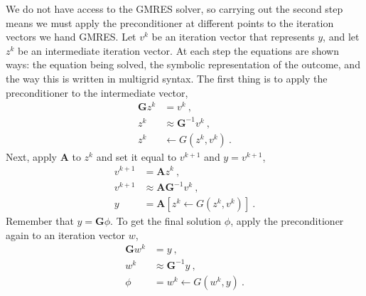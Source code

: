 \documentclass[12pt, letterpaper]{article}
\newcommand{\ve}[1]{\ensuremath{\mathbf{#1}}}
\begin{document}
We do not have access to the GMRES solver, so carrying out the second step means we must apply the preconditioner at different points to the iteration vectors we hand GMRES. Let $v^{k}$ be an iteration vector that represents $y$, and let $z^{k}$ be an intermediate iteration vector. At each step the equations are shown ways: the equation being solved, the symbolic representation of the outcome, and the way this is written in multigrid syntax. The first thing is to apply the preconditioner to the intermediate vector,
%
\begin{align}
  \ve{G}z^{k} &= v^{k} \:, \\
  z^{k} &\approx \ve{G}^{-1}v^{k} \:, \nonumber \\
  z^{k} &\leftarrow G(z^{k}, v^{k}) \:. \nonumber
\end{align}
%
Next, apply $\ve{A}$ to $z^{k}$ and set it equal to $v^{k+1}$ and $y = v^{k+1}$,
\begin{align}
  v^{k+1} &= \ve{A}z^{k} \:, \\
  v^{k+1} &\approx \ve{AG}^{-1}v^{k} \:, \nonumber \\
  y &= \ve{A}[z^{k} \leftarrow G(z^{k}, v^{k})] \:. \nonumber
\end{align}
%
Remember that $y = \ve{G}\phi$. To get the final solution $\phi$, apply the preconditioner again to an iteration vector $w$,
%
\begin{align}
  \ve{G}w^{k} &= y \:, \\
  w^{k} &\approx \ve{G}^{-1}y \:, \nonumber \\
  \phi &= w^{k} \leftarrow G(w^{k}, y) \:. \nonumber
\end{align}

\end{document}
